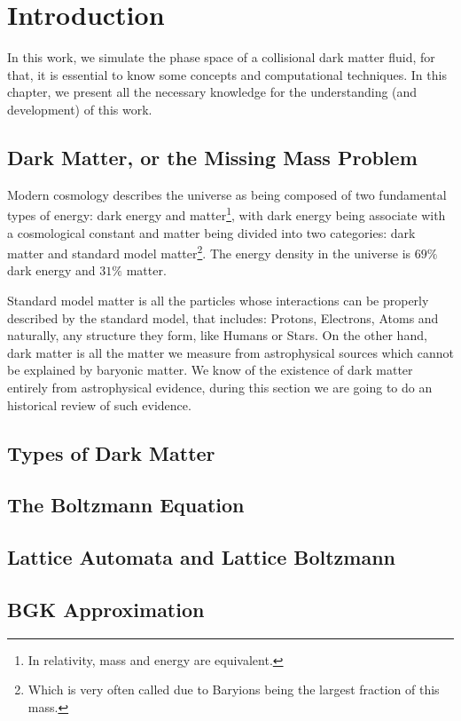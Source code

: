 \chapter{Introduction}
In this work, we simulate the phase space of a collisional dark matter fluid, for that, it is essential to know some concepts and computational techniques. In this chapter, we present all the necessary knowledge for the understanding (and development) of this work.
\section{Dark Matter, or the Missing Mass Problem}
Modern cosmology describes the universe as being composed of two fundamental types of energy: dark energy and matter\footnote{In relativity, mass and energy are equivalent.}, with dark energy being associate with a cosmological constant and matter being divided into two categories: dark matter and standard model matter\footnote{Which is very often called  due to Baryions being the largest fraction of this mass.}. The energy density in the universe is $69\%$ dark energy and $31\%$ matter.

Standard model matter is all the particles whose interactions can be properly described by the standard model, that includes: Protons, Electrons, Atoms and naturally, any structure they form, like Humans or Stars.
On the other hand, dark matter is all the matter we measure from astrophysical sources which cannot be explained by baryonic matter. We know of the existence of dark matter entirely from astrophysical evidence, during this section we are going to do an historical review of such evidence.
\section{Types of Dark Matter}
\section{The Boltzmann Equation}
\section{Lattice Automata and Lattice Boltzmann}
\section{BGK Approximation}
